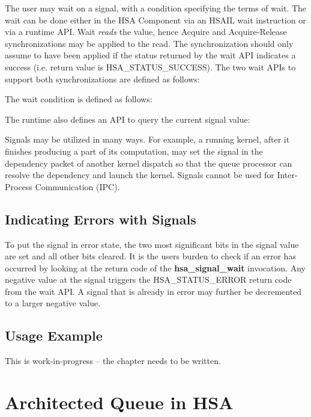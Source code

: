 \documentclass{book}
\newcommand{\reffun}[1]{\textbf{#1}}
\newcommand{\reftyp}[1]{#1}
\newcommand{\refenu}[1]{\reftyp{#1}}
\begin{document}


The user may wait on a signal, with a condition specifying the terms
of wait. The wait can be done either in the HSA Component via an HSAIL
wait instruction or via a runtime API. Wait \emph{reads} the value,
hence Acquire and Acquire-Release synchronizations may be applied to
the read. The synchronization should only assume to have been applied
if the status returned by the wait API indicates a success
(i.e. return value is \refenu{HSA\_STATUS\_SUCCESS}). The two wait APIs
to support both synchronizations are defined as follows:



The wait condition is defined as follows:



The runtime also defines an API to query the current signal value:



Signals may be utilized in many ways. For example, a running kernel,
after it finishes producing a part of its computation, may set the
signal in the dependency packet of another kernel dispatch so that the
queue processor can resolve the dependency and launch the
kernel. Signals cannot be used for Inter-Process Communication (IPC).

\hypertarget{signal_error}{} \subsection{ Indicating Errors with
  Signals} \label{signal_error} To put the signal in error state, the
two most significant bits in the signal value are set and all other
bits cleared. It is the users burden to check if an error has occurred
by looking at the return code of the \reffun{hsa\_signal\_wait}
invocation. Any negative value at the signal triggers the
\refenu{HSA\_STATUS\_ERROR} return code from the wait API. A signal
that is already in error may further be decremented to a larger
negative value.

\hypertarget{signal_example}{} \subsection{Usage Example}
This is {\color{red} work-in-progress} -- the chapter needs to be written.
\label{signal_example}


\hypertarget{architected\_queue}{} \section{Architected Queue in
HSA} \label{architected_queue}
\end{document}
